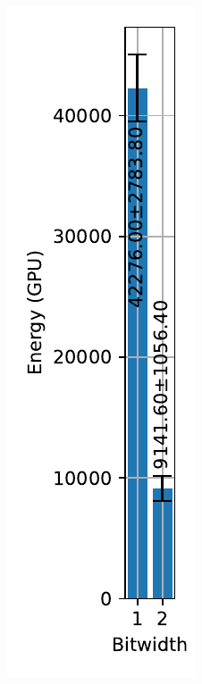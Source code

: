         \begin{figure}[H]
            \centering
            \begin{subfigure}[H]{0.48\textwidth}
                \includegraphics[width=\textwidth]{../timesteps/CIFAR10/plots/cifar10_train_energy_gpu.pdf}

\end{subfigure}
\end{figure}

